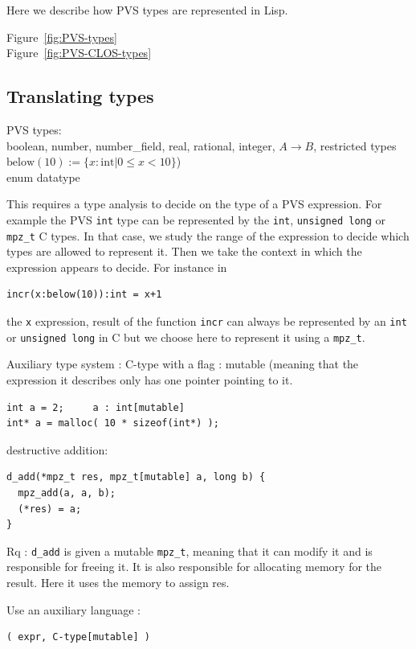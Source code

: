 \documentclass[12pt,a4paper,titlepage]{article}
\newcommand{\cl}[1]{\texttt{#1}}
\newcommand{\mpzt}{\texttt{mpz\_t}}
\begin{document}
Here we describe how PVS types are represented in 
Lisp.

Figure~\ref{fig:PVS-types} \\
Figure~\ref{fig:PVS-CLOS-types}


\subsection{Translating types}
PVS types:\\
boolean, number, number\_field, real, 
rational, integer, $A \rightarrow B$, restricted types
$\text{below}(10) := \{ x:\text{int} | 0 \leq x < 10 \} $)  \\
enum
datatype


This requires a type analysis to decide on the type of a PVS expression. For example the PVS \cl{int} type can be represented by the \cl{int}, \cl{unsigned long} or \cl{mpz\_t} C types. In that case, we study the range of the expression to decide which types are allowed to represent it. Then we take the context in which the expression appears to decide. For instance in
\begin{lstlisting}
incr(x:below(10)):int = x+1
\end{lstlisting}
the \cl{x} expression, result of the function \cl{incr} can always be represented by an \cl{int} or \cl{unsigned long} in C but we choose here to represent it using a \cl{mpz\_t}.

Auxiliary type system :
C-type with a flag : mutable (meaning that the expression it describes only has one pointer pointing to it.

\begin{lstlisting}
int a = 2;     a : int[mutable]
int* a = malloc( 10 * sizeof(int*) );  
\end{lstlisting}

destructive addition:

\begin{lstlisting}
d_add(*mpz_t res, mpz_t[mutable] a, long b) {
  mpz_add(a, a, b);
  (*res) = a;
}
\end{lstlisting}

Rq : \cl{d\_add} is given a mutable \mpzt, meaning that it can modify it and is responsible for freeing it.
It is also responsible for allocating memory for the result.
Here it uses the memory to assign res.



Use an auxiliary language :

\begin{lstlisting}
( expr, C-type[mutable] )
\end{lstlisting}
\end{document}
